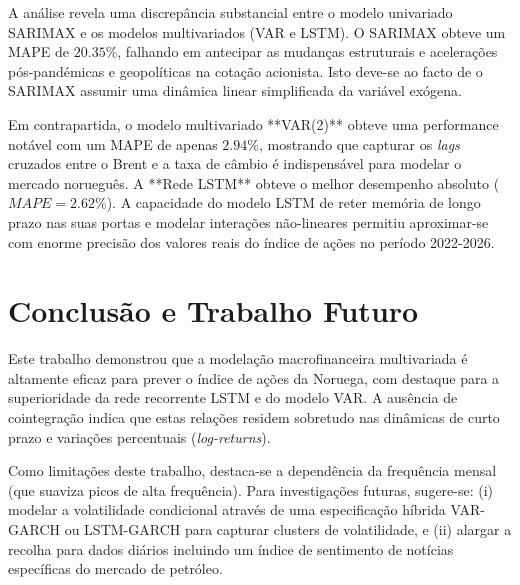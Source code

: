 \documentclass[11pt,a4paper]{article}
\begin{document}
A análise revela uma discrepância substancial entre o modelo univariado SARIMAX e os modelos multivariados (VAR e LSTM). O SARIMAX obteve um MAPE de $20.35\%$, falhando em antecipar as mudanças estruturais e acelerações pós-pandémicas e geopolíticas na cotação acionista. Isto deve-se ao facto de o SARIMAX assumir uma dinâmica linear simplificada da variável exógena.

Em contrapartida, o modelo multivariado **VAR(2)** obteve uma performance notável com um MAPE de apenas $2.94\%$, mostrando que capturar os \textit{lags} cruzados entre o Brent e a taxa de câmbio é indispensável para modelar o mercado norueguês. A **Rede LSTM** obteve o melhor desempenho absoluto ($MAPE = 2.62\%$). A capacidade do modelo LSTM de reter memória de longo prazo nas suas portas e modelar interações não-lineares permitiu aproximar-se com enorme precisão dos valores reais do índice de ações no período 2022-2026.

\section{Conclusão e Trabalho Futuro}
Este trabalho demonstrou que a modelação macrofinanceira multivariada é altamente eficaz para prever o índice de ações da Noruega, com destaque para a superioridade da rede recorrente LSTM e do modelo VAR. A ausência de cointegração indica que estas relações residem sobretudo nas dinâmicas de curto prazo e variações percentuais (\textit{log-returns}).

Como limitações deste trabalho, destaca-se a dependência da frequência mensal (que suaviza picos de alta frequência). Para investigações futuras, sugere-se: (i) modelar a volatilidade condicional através de uma especificação híbrida VAR-GARCH ou LSTM-GARCH para capturar clusters de volatilidade, e (ii) alargar a recolha para dados diários incluindo um índice de sentimento de notícias específicas do mercado de petróleo.
\end{document}
